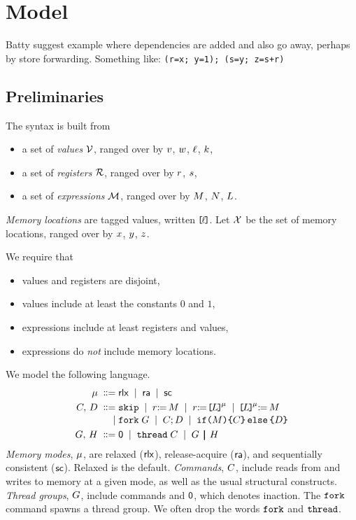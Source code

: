 \section{Model}

Batty suggest example where dependencies are added and also go away, perhaps
by store forwarding. Something like:
\texttt{(r=x; y=1); (s=y; z=s+r)}

\subsection{Preliminaries}
The syntax is built from
\begin{itemize}
\item a set of \emph{values} $\mathcal{V}$, ranged over by
  $v$, $w$, $\ell$, $k$,
\item a set of \emph{registers} $\mathcal{R}$, ranged over by
  $r$, $s$,
\item a set of \emph{expressions} $\mathcal{M}$, ranged over by
  $M$, $N$,  $L$.
\end{itemize}
\emph{Memory locations} are tagged values, written $\mkern-2mu\texttt{[}\mkern-2mu\ell \mkern-2mu\texttt{]}\mkern-2mu$.  Let $\mathcal{X}$
be the set of memory locations, ranged over by $x$, $y$, $z$.

We require that
\begin{itemize}
\item values and registers are disjoint,
\item values include at least the constants $0$ and $1$,
\item expressions include at least registers and values, 
\item expressions do \emph{not} include memory locations.
\end{itemize}
We model the following language.
\begin{align*}
  \amode \BNFDEF& \mRLX
  \BNFSEP \mRA 
  \BNFSEP \mSC
  \\
  \aCmd,\,\bCmd
  \BNFDEF& \SKIP
  \BNFSEP \LET{\aReg}{\aExp}
  \BNFSEP \PRREF[\amode]{\cExp}{\aReg}
  \BNFSEP \PWREF[\amode]{\cExp}{\aExp}
  \\[-.5ex]
  \BNFSEP& \FORK{\aGrp}
  \BNFSEP \aCmd \SEMI \bCmd
  \BNFSEP \IF{\aExp} \THEN \aCmd \ELSE \bCmd \FI
  \\
  \aGrp ,\,\bGrp
  \BNFDEF& \NIL
  \BNFSEP\THREAD{\aCmd}
  \BNFSEP\aGrp \PAR \bGrp
\end{align*}
\emph{Memory modes}, $\mu$, are {relaxed} (${\mathsf{rlx}}$), {release-acquire}
(${\mathsf{ra}}$), and {sequentially consistent} (${\mathsf{sc}}$).  Relaxed is the default.
%
\emph{Commands}, $C$, include reads from and writes to memory at a given
mode, as well as the usual structural constructs.
%
\emph{Thread groups}, $G$, include commands and $\mathsf{0}$, which denotes
inaction. %
%
The $\FORK{}$ command spawns a thread group.  We often drop the words
$\FORK{}$ and $\THREAD{}$.

